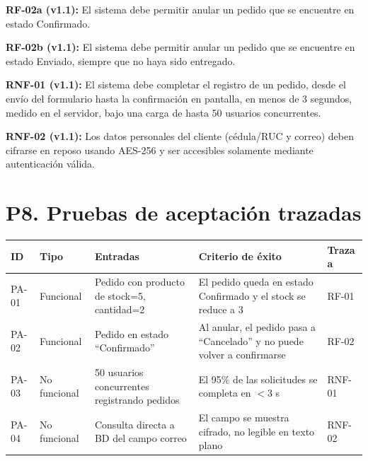 \documentclass[12pt,a4paper]{article}
\begin{document}
\textbf{RF-02a (v1.1):} El sistema debe permitir anular un pedido que se encuentre en estado Confirmado.

\medskip

\textbf{RF-02b (v1.1):} El sistema debe permitir anular un pedido que se encuentre en estado Enviado, siempre que no haya sido entregado.

\medskip

\textbf{RNF-01 (v1.1):} El sistema debe completar el registro de un pedido, desde el envío del formulario hasta la confirmación en pantalla, en menos de 3 segundos, medido en el servidor, bajo una carga de hasta 50 usuarios concurrentes.

\medskip

\textbf{RNF-02 (v1.1):} Los datos personales del cliente (cédula/RUC y correo) deben cifrarse en reposo usando AES-256 y ser accesibles solamente mediante autenticación válida.


\section{P8. Pruebas de aceptación trazadas}

\begin{longtable}{p{1.5cm}p{2cm}p{4cm}p{5cm}p{2cm}}
\toprule
\textbf{ID} & \textbf{Tipo} & \textbf{Entradas} & \textbf{Criterio de éxito} & \textbf{Traza a} \\
\midrule

PA-01 & Funcional &
Pedido con producto de stock=5, cantidad=2 &
El pedido queda en estado Confirmado y el stock se reduce a 3 &
RF-01 \\

PA-02 & Funcional &
Pedido en estado ``Confirmado'' &
Al anular, el pedido pasa a ``Cancelado'' y no puede volver a confirmarse &
RF-02 \\

PA-03 & No funcional &
50 usuarios concurrentes registrando pedidos &
El 95\% de las solicitudes se completa en $<3$ s &
RNF-01 \\

PA-04 & No funcional &
Consulta directa a BD del campo correo &
El campo se muestra cifrado, no legible en texto plano &
RNF-02 \\

\bottomrule
\end{longtable}

\end{document}
